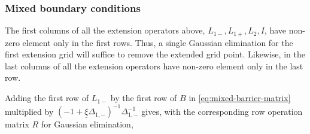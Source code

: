 \documentclass[11pt]{article}
\theoremstyle{definition}
\begin{document}
\subsubsection{Mixed boundary conditions}\label{subsubsec-irregular-grids-mixed-boundary-conditions}

The first columns of all the extension operators above, ${L}_{1-}, {L}_{1+}, {L}_{2}, {I}$, have non-zero element only in the first rows. Thus, a single Gaussian elimination for the first extension grid will suffice to remove the extended grid point. Likewise, in the last columns of all the extension operators have non-zero element only in the last row.


Adding the first row of $L_{1-}$ by the first row of $B$ in \eqref{eq:mixed-barrier-matrix} multiplied by $(-1 + \underline{\xi} \Delta_{1,-} )^{-1}\Delta_{1,-}^{-1}$ gives, with the corresponding row operation matrix $R$ for Gaussian elimination,
\end{document}
